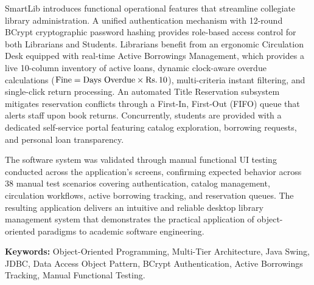 SmartLib introduces functional operational features that streamline collegiate library administration. A unified authentication mechanism with 12-round BCrypt cryptographic password hashing provides role-based access control for both Librarians and Students. Librarians benefit from an ergonomic Circulation Desk equipped with real-time Active Borrowings Management, which provides a live 10-column inventory of active loans, dynamic clock-aware overdue calculations ($\text{Fine} = \text{Days Overdue} \times \text{\text{Rs.\,}} 10$), multi-criteria instant filtering, and single-click return processing. An automated Title Reservation subsystem mitigates reservation conflicts through a First-In, First-Out (FIFO) queue that alerts staff upon book returns. Concurrently, students are provided with a dedicated self-service portal featuring catalog exploration, borrowing requests, and personal loan transparency. 

The software system was validated through manual functional UI testing conducted across the application's screens, confirming expected behavior across 38 manual test scenarios covering authentication, catalog management, circulation workflows, active borrowing tracking, and reservation queues. The resulting application delivers an intuitive and reliable desktop library management system that demonstrates the practical application of object-oriented paradigms to academic software engineering.

\vspace*{1cm}
\noindent \textbf{Keywords:} Object-Oriented Programming, Multi-Tier Architecture, Java Swing, JDBC, Data Access Object Pattern, BCrypt Authentication, Active Borrowings Tracking, Manual Functional Testing.

\newpage


\tableofcontents
\newpage

\listoffigures
\newpage

\listoftables
\newpage

\setcounter{page}{1}
